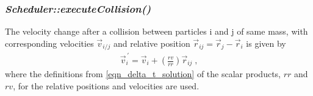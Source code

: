 \subsubsection{\quad \textit{Scheduler::executeCollision()}}
The velocity change after a collision between particles i and j of same mass, with corresponding velocities $\vec{v}_{i/j}$ and relative position $\vec{r}_{ij} = \vec{r}_{j} -\vec{r}_{i}$ is given by   
\begin{align}
\label{eqn:collision_result}
\vec{v}_i^{\,'} = \vec{v}_i + \left( \frac{rv}{rr} \right) \vec{r}_{ij} \; \text{,}
\end{align}
where the definitions from \autoref{eqn_delta_t_solution} of the scalar products, $rr$ and $rv$, for the relative positions and velocities are used.\\
 
